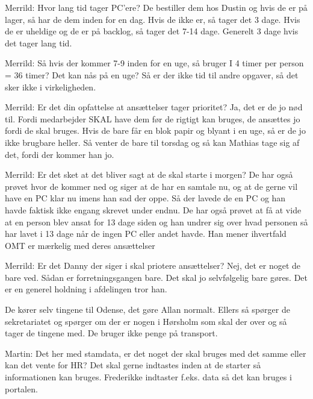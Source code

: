 \begin{linenumbers*}
Merrild: Hvor lang tid tager PC’ere?
De bestiller dem hos Dustin og hvis de er på lager, så har de dem inden for en dag. Hvis de ikke er, så tager det 3 dage. Hvis de er uheldige og de er på backlog, så tager det 7-14 dage. Generelt 3 dage hvis det tager lang tid. 

Merrild: Så hvis der kommer 7-9 inden for en uge, så bruger I 4 timer per person = 36 timer? Det kan nås på en uge?
Så er der ikke tid til andre opgaver, så det sker ikke i virkeligheden. 

Merrild: Er det din opfattelse at ansættelser tager prioritet?
Ja, det er de jo nød til. Fordi medarbejder SKAL have dem før de rigtigt kan bruges, de ansættes jo fordi de skal bruges. Hvis de bare får en blok papir og blyant i en uge, så er de jo ikke brugbare heller. Så venter de bare til torsdag og så kan Mathias tage sig af det, fordi der kommer han jo. 

Merrild: Er det sket at det bliver sagt at de skal starte i morgen?
De har også prøvet hvor de kommer ned og siger at de har en samtale nu, og at de gerne vil have en PC klar nu imens han sad der oppe. Så der lavede de en PC og han havde faktisk ikke engang skrevet under endnu.
De har også prøvet at få at vide at en person blev ansat for 13 dage siden og han undrer sig over hvad personen så har lavet i 13 dage når de ingen PC eller andet havde. Han mener ihvertfald OMT er mærkelig med deres ansættelser

Merrild: Er det Danny der siger i skal priotere ansættelser?
Nej, det er noget de bare ved. Sådan er forretningsgangen bare. Det skal jo selvfølgelig bare gøres. Det er en generel holdning i afdelingen tror han. 

De kører selv tingene til Odense, det gøre Allan normalt. Ellers så spørger de sekretariatet og spørger om der er nogen i Hørsholm som skal der over og så tager de tingene med. De bruger ikke penge på transport. 

Martin: Det her med stamdata, er det noget der skal bruges med det samme eller kan det vente for HR?
Det skal gerne indtastes inden at de starter så informationen kan bruges. Frederikke indtaster f.eks. data så det kan bruges i portalen. 
\end{linenumbers*}